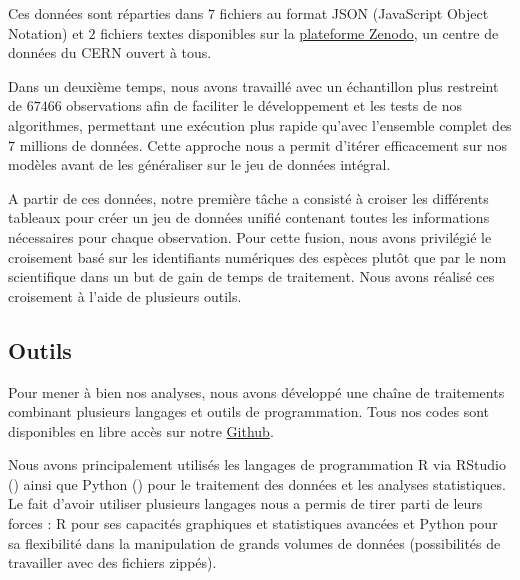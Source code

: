 \documentclass[a4paper,12pt]{article}
\begin{document}
\vspace{0.2cm}

Ces données sont réparties dans $7$ fichiers au format JSON (JavaScript Object Notation) et $2$ fichiers textes disponibles sur la \href{https://zenodo.org/records/10782465}{plateforme Zenodo}, un centre de données du CERN ouvert à tous.

\vspace{0.2cm}

Dans un deuxième temps, nous avons travaillé avec un échantillon plus restreint de $\num{67 466}$ observations afin de faciliter le développement et les tests de nos algorithmes, permettant une exécution plus rapide qu'avec l'ensemble complet des $7$ millions de données. Cette approche nous a permit d'itérer efficacement sur nos modèles avant de les généraliser sur le jeu de données intégral.

\vspace{0.2cm}

A partir de ces données, notre première tâche a consisté à croiser les différents tableaux pour créer un jeu de données unifié contenant toutes les informations nécessaires pour chaque observation. Pour cette fusion, nous avons privilégié le croisement basé sur les identifiants numériques des espèces plutôt que par le nom scientifique dans un but de gain de temps de traitement. Nous avons réalisé ces croisement à l'aide de plusieurs outils.


\subsection{Outils}

Pour mener à bien nos analyses, nous avons développé une chaîne de traitements combinant plusieurs langages et outils de programmation. Tous nos codes sont disponibles en libre accès sur notre \href{https://github.com/lcletz/PLANTNET_M1_SSD}{Github}.

\vspace{0.2cm}

Nous avons principalement utilisés les langages de programmation R via RStudio (\cite{RStudio}) ainsi que Python (\cite{Python}) pour le traitement des données et les analyses statistiques. Le fait d'avoir utiliser plusieurs langages nous a permis de tirer parti de leurs forces : R pour ses capacités graphiques et statistiques avancées et Python pour sa flexibilité dans la manipulation de grands volumes de données (possibilités de travailler avec des fichiers zippés).
\end{document}
